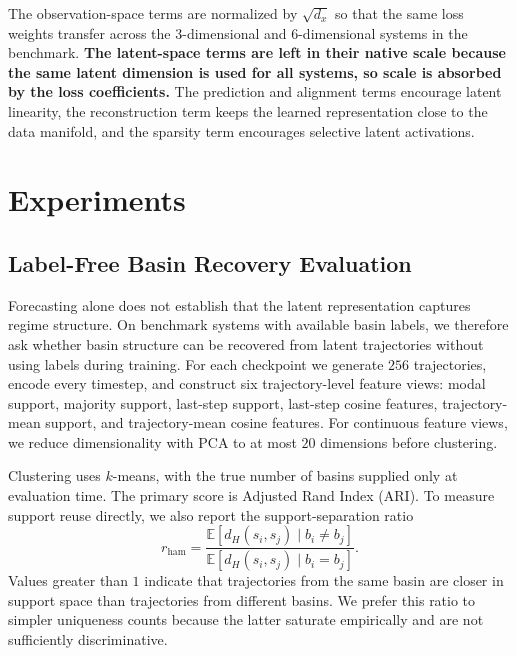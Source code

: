 The observation-space terms are normalized by $\sqrt{d_x}$ so that the same loss weights transfer across the 3-dimensional and 6-dimensional systems in the benchmark. 
\textbf{The latent-space terms are left in their native scale because the same latent dimension is used for all systems, so scale is absorbed by the loss coefficients. }
The prediction and alignment terms encourage latent linearity, the reconstruction term keeps the learned representation close to the data manifold, and the sparsity term encourages selective latent activations.



\section{Experiments}
\label{sec:experiments}


\subsection{Label-Free Basin Recovery Evaluation}
\label{sec:label-free-eval}


Forecasting alone does not establish that the latent representation captures regime structure. On benchmark systems with available basin labels, we therefore ask whether basin structure can be recovered from latent trajectories without using labels during training. For each checkpoint we generate $256$ trajectories, encode every timestep, and construct six trajectory-level feature views: modal support, majority support, last-step support, last-step cosine features, trajectory-mean support, and trajectory-mean cosine features. For continuous feature views, we reduce dimensionality with PCA to at most $20$ dimensions before clustering.

Clustering uses $k$-means, with the true number of basins supplied only at evaluation time. The primary score is Adjusted Rand Index (ARI). To measure support reuse directly, we also report the support-separation ratio
\begin{equation}
    r_{\mathrm{ham}}
    =
    \frac{\mathbb{E}[d_H(s_i,s_j) \mid b_i \neq b_j]}
         {\mathbb{E}[d_H(s_i,s_j) \mid b_i = b_j]} .
\end{equation}
Values greater than $1$ indicate that trajectories from the same basin are closer in support space than trajectories from different basins. We prefer this ratio to simpler uniqueness counts because the latter saturate empirically and are not sufficiently discriminative.

